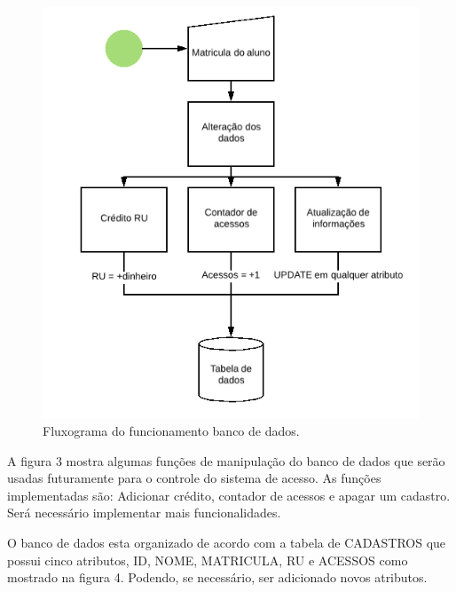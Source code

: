 \documentclass[conference,compsoc]{IEEEtran}
\begin{document}
\begin{figure}[!ht]
		\centering
		\includegraphics[scale=0.25]{Banco_de_dados.png}
		\caption{Fluxograma do funcionamento banco de dados.}
\end{figure}

A figura 3 mostra algumas funções de manipulação do banco de dados que serão usadas futuramente para o controle do sistema de acesso. As funções implementadas são: Adicionar crédito, contador de acessos e apagar um cadastro. Será necessário implementar mais funcionalidades.

O banco de dados esta organizado de acordo com a tabela de CADASTROS que possui cinco atributos, ID, NOME, MATRICULA, RU e ACESSOS como mostrado na figura 4. Podendo, se necessário, ser adicionado novos atributos.  
\end{document}
